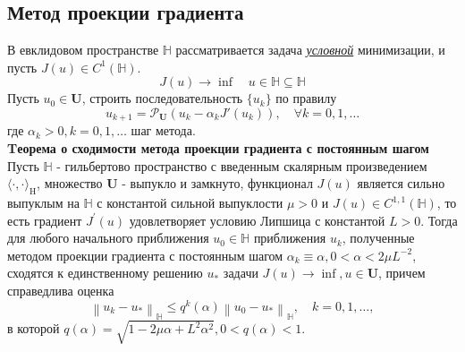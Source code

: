 \documentclass[A4]{article}
\begin{document}
\subsection{Метод проекции градиента}
В евклидовом пространстве $\mathbb{H}$ рассматривается задача \underline{\emph{условной}} минимизации, и пусть $J(u)\in C^1(\mathbb{H}).$
\begin{equation*}
J(u)\rightarrow \inf\quad u\in\mathbb{H}\subseteq\mathbb{H}
\end{equation*}
Пусть $u_0\in\mathbf{U}$, строить последовательность $\{u_k\}$ по правилу
\begin{equation*}
u_{k+1}=\mathcal{P}_{\mathbf{U}}(u_k-\alpha_kJ'(u_k)),\quad \forall k=0,1,\ldots
\end{equation*}
где $\alpha_k >0,k=0,1,\ldots$ шаг метода. \\
\textbf{Tеорема о сходимости метода проекции градиента с постоянным шагом} Пусть $\mathbb{H}$ - гильбертово пространство с введенным скалярным произведением $ \langle\cdot, \cdot\rangle_{\mathrm{H}}$, множество $ \mathbf{U}$ - выпукло и замкнуто, функционал $ J(u) $ является сильно выпуклым на $ \mathbb{H} $ с константой сильной выпуклости $ \mu>0 $ и $ J(u) \in C^{1,1}(\mathbb{H})$, то есть градиент $ J^{\prime}(u)$ удовлетворяет условию Липшица с константой $ L>0$. Тогда для любого начального приближения $ u_{0} \in \mathbb{H} $ приближения $ u_{k}$, полученные методом проекции градиента с постоянным шагом $ \alpha_{k} \equiv \alpha, 0<\alpha<2 \mu L^{-2}$, сходятся к единственному решению $ u_{*} $ задачи $ J(u) \rightarrow \inf , u \in \mathbf{U}$,  причем справедлива оценка
\begin{equation*}
\left\|u_{k}-u_{*}\right\|_{\mathbb{H}} \leqslant q^{k}(\alpha)\left\|u_{0}-u_{*}\right\|_{\mathbb{H}}, \quad k=0,1, \ldots,
\end{equation*}
в которой $ q(\alpha)=\sqrt{1-2 \mu \alpha+L^{2} \alpha^{2}}, 0<q(\alpha)<1 $.
\end{document}
